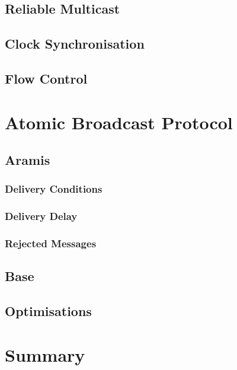 	\subsection{Reliable Multicast}\label{ssec:rmcast}
	\subsection{Clock Synchronisation}\label{ssec:clocksynch}
	\subsection{Flow Control}\label{ssec:fcc}
	
\section{Atomic Broadcast Protocol}

    \subsection{Aramis}
    
	    \subsubsection{Delivery Conditions}    
	    
		\subsubsection{Delivery Delay}
		\subsubsection{Rejected Messages}
		
	\subsection{Base}
	
	\subsection{Optimisations}
		
\section{Summary}